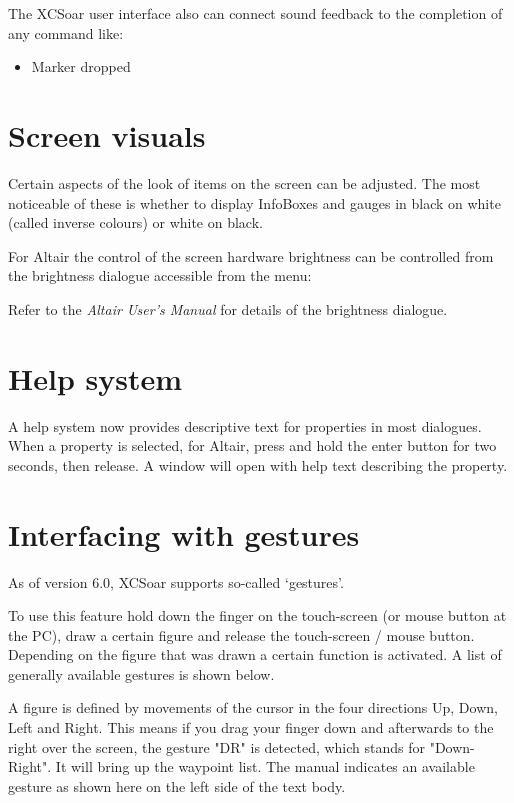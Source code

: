 The XCSoar user interface also can connect sound feedback to the completion 
of any command like:
\begin{itemize}
\item Marker dropped
\end{itemize}

\section{Screen visuals}

Certain aspects of the look of items on the screen can be adjusted.
The most noticeable of these is whether to display InfoBoxes and
gauges in black on white (called inverse colours) or white on black.

For Altair the control of the screen hardware 
brightness can be controlled from the brightness dialogue
accessible from the menu:
\begin{quote}
\blink{}
\end{quote}

Refer to the {\em Altair User's Manual} for details of the brightness
dialogue.


\section{Help system}
A help system now provides descriptive text for properties in
most dialogues.  When a property is selected, for Altair, press and hold the
enter button for two seconds, then release.  A window will open with
help text describing the property.

\section{Interfacing with gestures}\label{sec:gestures}
As of version 6.0, XCSoar supports so-called `gestures'.

To use this feature hold down the finger on the 
touch-screen (or mouse button at the PC), draw a certain figure and release 
the touch-screen / mouse button. Depending on the figure that was drawn 
a certain function is activated. A list of generally available gestures is 
shown below. 

A figure is defined by movements of the 
cursor in the four directions Up, Down, Left and Right. This means if 
you drag your finger down and afterwards to the right over the screen, 
 the gesture "DR" is detected, which stands for "Down-Right". 
It will bring up the waypoint list. The manual indicates an available 
gesture as shown here on the left side of the text body.

